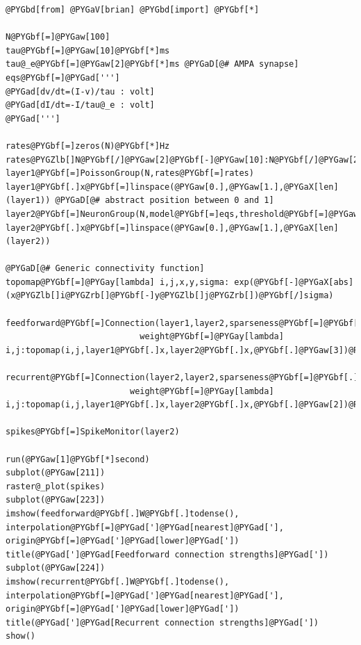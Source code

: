 \documentclass[letterpaper,10pt,english]{manual}
\begin{document}
\begin{Verbatim}[commandchars=@\[\]]
@PYGbd[from] @PYGaV[brian] @PYGbd[import] @PYGbf[*]

N@PYGbf[=]@PYGaw[100]
tau@PYGbf[=]@PYGaw[10]@PYGbf[*]ms
tau@_e@PYGbf[=]@PYGaw[2]@PYGbf[*]ms @PYGaD[@# AMPA synapse]
eqs@PYGbf[=]@PYGad[''']
@PYGad[dv/dt=(I-v)/tau : volt]
@PYGad[dI/dt=-I/tau@_e : volt]
@PYGad[''']

rates@PYGbf[=]zeros(N)@PYGbf[*]Hz
rates@PYGZlb[]N@PYGbf[/]@PYGaw[2]@PYGbf[-]@PYGaw[10]:N@PYGbf[/]@PYGaw[2]@PYGbf[+]@PYGaw[10]@PYGZrb[]@PYGbf[=]ones(@PYGaw[20])@PYGbf[*]@PYGaw[30]@PYGbf[*]Hz
layer1@PYGbf[=]PoissonGroup(N,rates@PYGbf[=]rates)
layer1@PYGbf[.]x@PYGbf[=]linspace(@PYGaw[0.],@PYGaw[1.],@PYGaX[len](layer1)) @PYGaD[@# abstract position between 0 and 1]
layer2@PYGbf[=]NeuronGroup(N,model@PYGbf[=]eqs,threshold@PYGbf[=]@PYGaw[10]@PYGbf[*]mV,reset@PYGbf[=]@PYGaw[0]@PYGbf[*]mV)
layer2@PYGbf[.]x@PYGbf[=]linspace(@PYGaw[0.],@PYGaw[1.],@PYGaX[len](layer2))

@PYGaD[@# Generic connectivity function]
topomap@PYGbf[=]@PYGay[lambda] i,j,x,y,sigma: exp(@PYGbf[-]@PYGaX[abs](x@PYGZlb[]i@PYGZrb[]@PYGbf[-]y@PYGZlb[]j@PYGZrb[])@PYGbf[/]sigma)

feedforward@PYGbf[=]Connection(layer1,layer2,sparseness@PYGbf[=]@PYGbf[.]@PYGaw[5],
                           weight@PYGbf[=]@PYGay[lambda] i,j:topomap(i,j,layer1@PYGbf[.]x,layer2@PYGbf[.]x,@PYGbf[.]@PYGaw[3])@PYGbf[*]@PYGaw[3]@PYGbf[*]mV)

recurrent@PYGbf[=]Connection(layer2,layer2,sparseness@PYGbf[=]@PYGbf[.]@PYGaw[5],
                         weight@PYGbf[=]@PYGay[lambda] i,j:topomap(i,j,layer1@PYGbf[.]x,layer2@PYGbf[.]x,@PYGbf[.]@PYGaw[2])@PYGbf[*]@PYGbf[.]@PYGaw[5]@PYGbf[*]mV)

spikes@PYGbf[=]SpikeMonitor(layer2)

run(@PYGaw[1]@PYGbf[*]second)
subplot(@PYGaw[211])
raster@_plot(spikes)
subplot(@PYGaw[223])
imshow(feedforward@PYGbf[.]W@PYGbf[.]todense(), interpolation@PYGbf[=]@PYGad[']@PYGad[nearest]@PYGad['], origin@PYGbf[=]@PYGad[']@PYGad[lower]@PYGad['])
title(@PYGad[']@PYGad[Feedforward connection strengths]@PYGad['])
subplot(@PYGaw[224])
imshow(recurrent@PYGbf[.]W@PYGbf[.]todense(), interpolation@PYGbf[=]@PYGad[']@PYGad[nearest]@PYGad['], origin@PYGbf[=]@PYGad[']@PYGad[lower]@PYGad['])
title(@PYGad[']@PYGad[Recurrent connection strengths]@PYGad['])
show()
\end{Verbatim}

\resetcurrentobjects
\hypertarget{--doc-examples-misc_transient_sync}{}
\end{document}
